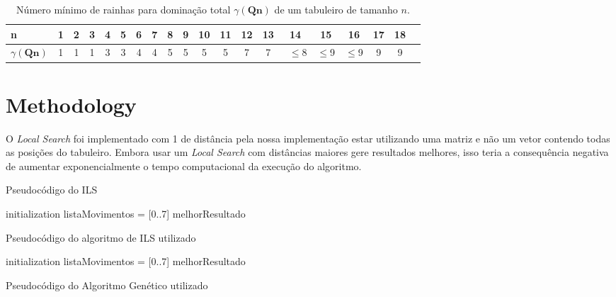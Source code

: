 \documentclass[
	article,			%
	11pt,				%
	oneside,			%
	a4paper,			%
	english,			%
	brazil,				%
	sumario=tradicional
	]{abntex2}
\begin{document}
\begin{table}[ht]
  \caption{Número mínimo de rainhas para dominação total $\gamma(\textbf{Qn})$ de um tabuleiro de tamanho $\textit{n}$.}
  \begin{tabular}{l*{18}{c}r}
    n              & 1 & 2 & 3 & 4 & 5  & 6 & 7 & 8 & 9 & 10 & 11 & 12 & 13 & 14 & 15 & 16 & 17 & 18 \\
    \hline
    $\gamma(\textbf{Qn})$ & 1 & 1 & 1 & 3 & 3 & 4 & 4 & 5 & 5 & 5 & 5 & 7 & 7 & ~$\leq$8 & $\leq$9 & $\leq$9  & 9 & 9 \\
  \end{tabular}
  \label{tabela1}
\end{table}


\section{Methodology}

O \textit{Local Search} foi implementado com 1 de distância pela nossa implementação estar utilizando uma matriz e não um vetor contendo todas as posições do tabuleiro. Embora usar um \textit{Local Search} com distâncias maiores gere resultados melhores, isso teria a consequência negativa de aumentar exponencialmente o tempo computacional da execução do algoritmo.

Pseudocódigo do ILS
\begin{algorithm}
  initialization\;
  listaMovimentos = [0..7]\;
  melhorResultado\;
  \caption{Pseudocódigo do algoritmo de ILS utilizado}
 \end{algorithm}

 \begin{algorithm}
  initialization\;
  listaMovimentos = [0..7]\;
  melhorResultado\;
  \caption{Pseudocódigo do Algoritmo Genético utilizado}
 \end{algorithm}
 
\end{document}
